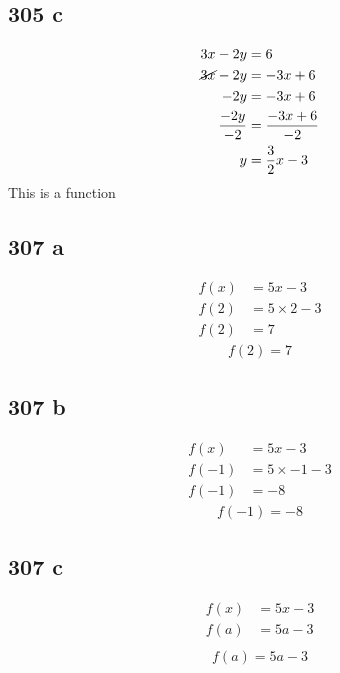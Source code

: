 \documentclass{article}
\begin{document}
    \subsection*{305 c}
    \begin{align*}
        3x - 2y &= 6\\
        \cancel{3x} - 2y &= -3x +6\\
        - 2y &= -3x +6\\
        \frac{- 2y}{-2} &= \frac{-3x +6}{-2}\\
        y &= \frac{3}{2}x - 3
    \end{align*}
    \hspace{4cm}This is a function

    \subsection*{307 a}
    \begin{align*}
        f(x) &= 5x - 3\\
        f(2) &= 5 \times 2 - 3\\
        f(2) &= 7
    \end{align*}
    \begin{align*}
        \boxed{f(2) = 7}
    \end{align*}

    \subsection*{307 b}
    \begin{align*}
        f(x) &= 5x - 3\\
        f(-1) &= 5 \times -1 - 3\\
        f(-1) &= -8
    \end{align*}
    \begin{align*}
        \boxed{f(-1) = -8}
    \end{align*}

    \subsection*{307 c}
    \begin{align*}
        f(x) &= 5x - 3\\
        f(a) &= 5a- 3\\
    \end{align*}
    \begin{align*}
        \boxed{f(a) = 5a- 3}
    \end{align*}
\end{document}
